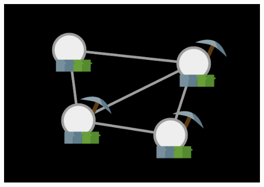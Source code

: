 \documentclass[xcolor=x11names,compress]{beamer}
\makeatletter
\let\beamer@writeslidentry@miniframeson=\beamer@writeslidentry
\newcommand*{\miniframeson}{\let\beamer@writeslidentry=\beamer@writeslidentry@miniframeson}
\makeatother
\begin{document}
\begin{frame}
\begin{overprint}
\begin{center}
		\end{center}
		\begin{center}
			\includegraphics[width=\textwidth,height=0.8\textheight,keepaspectratio]{img/mining/15.pdf}
		\end{center}
	\end{overprint}
\end{frame}

\begin{frame}
\end{frame}
\miniframeson
\end{document}
